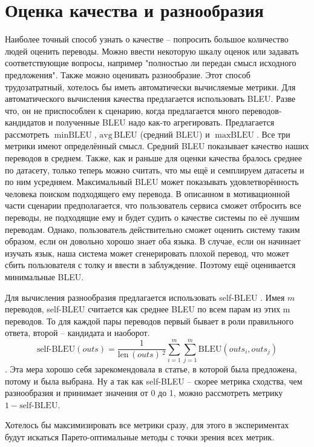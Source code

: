 \documentclass[a4paper, 12pt]{extarticle}
\begin{document}
\section{Оценка качества и разнообразия}
    Наиболее точный способ узнать о качестве -- попросить большое количество людей оценить переводы. Можно ввести некоторую шкалу оценок или задавать соответствующие вопросы, например "полностью ли передан смысл исходного предложения". Также можно оценивать разнообразие. Этот способ трудозатратный, хотелось бы иметь автоматически вычисляемые метрики.
    Для автоматического вычисления качества предлагается использовать BLEU. Разве что, он не приспособлен к сценарию, когда предлагается много переводов-кандидатов и полученные BLEU надо как-то агрегировать. Предлагается рассмотреть $\min \textrm{BLEU}$, $\textrm{avg} \, \textrm{BLEU}$ (средний BLEU) и $\max \textrm{BLEU}$. Все три метрики имеют определённый смысл. Средний BLEU показывает качество наших переводов в среднем. Также, как и раньше для оценки качества бралось среднее по датасету, только теперь можно считать, что мы ещё и семплируем датасеты и по ним усредняем. Максимальный BLEU может показывать удовлетворённость человека поиском подходящего ему перевода. В описанном в мотивационной части сценарии предполагается, что пользователь сервиса сможет отбросить все переводы, не подходящие ему и будет судить о качестве системы по её лучшим переводам. Однако, пользователь действительно сможет оценить систему таким образом, если он довольно хорошо знает оба языка. В случае, если он начинает изучать язык, наша система может сгенерировать плохой перевод, что может сбить пользователя с толку и ввести в заблуждение. Поэтому ещё оценивается минимальные BLEU.

    Для вычисления разнообразия предлагается использовать self-BLEU \cite{self-bleu}. Имея $m$ переводов, self-BLEU считается как среднее BLEU по всем парам из этих m переводов. То для каждой пары переводов первый бывает в роли правильного ответа, второй -- кандидата и наоборот. $$\textrm{self-BLEU}(outs) = \frac{1}{\textrm{len} \, (outs) \, ^2} \sum\limits_{i=1}^m \sum\limits_{j=1}^m \textrm{BLEU} (outs_i, outs_j )$$. Эта мера хорошо себя зарекомендовала в статье, в которой была предложена, потому и была выбрана. Ну а так как self-BLEU -- скорее метрика сходства, чем разнообразия и принимает значения от 0 до 1, можно рассмотреть метрику $1 - \textrm{self-BLEU}$.

    Хотелось бы максимизировать все метрики сразу, для этого в экспериментах будут искаться Парето-оптимальные методы с точки зрения всех метрик.
\end{document}
